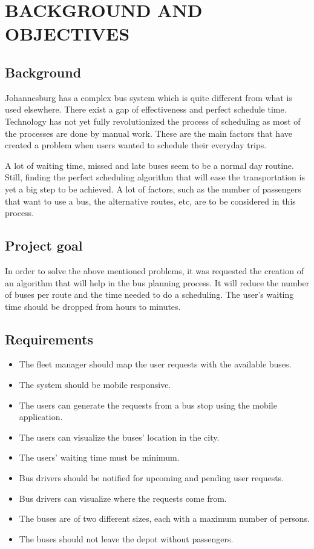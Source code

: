\section{BACKGROUND AND OBJECTIVES}
\subsection{Background}
Johannesburg has a complex bus system which is quite different from what is used elsewhere. There exist a gap of effectiveness and perfect schedule time. Technology has not yet fully revolutionized the process of scheduling as most of the processes are done by manual work. These are the main factors that have created a problem when users wanted to schedule their everyday trips.

A lot of waiting time, missed and late buses seem to be a normal day routine. Still, finding the perfect scheduling algorithm that will ease the transportation is yet a big step to be achieved. A lot of factors, such as the number of passengers that want to use a bus, the alternative routes, etc, are to be considered in this process. 
\subsection{Project goal}
In order to solve the above mentioned problems, it was requested the creation of an algorithm that will help in the bus planning process. It will reduce the number of buses per route and the time needed to do a scheduling. The user’s waiting time should be dropped from hours to minutes. 
\subsection{Requirements}
\begin{itemize}
	\item The fleet manager should map the user requests with the available buses.
	\item The system should be mobile responsive.
	\item The users can generate the requests from a bus stop using the mobile application.
	\item The users can visualize the buses’ location in the city. 
	\item The users’ waiting time must be minimum.
	\item Bus drivers should be notified for upcoming and pending user requests.
	\item Bus drivers can visualize where the requests come from. 
	\item The buses are of two different sizes, each with a maximum number of persons.
	\item The buses should not leave the depot without passengers.
\end{itemize}


